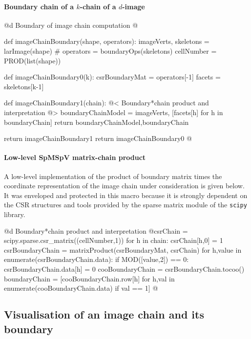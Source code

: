 \documentclass[11pt,oneside]{article}	%
\begin{document}
\paragraph{Boundary chain of a $k$-chain of a $d$-image}

@d Boundary of image chain computation
@{def imageChainBoundary(shape, operators):
	imageVerts, skeletons = larImage(shape)
	# operators = boundaryOps(skeletons)
	cellNumber = PROD(list(shape))
	
	def imageChainBoundary0(k):
		csrBoundaryMat = operators[-1]
		facets = skeletons[k-1]
		
		def imageChainBoundary1(chain):
			@< Boundary*chain product and interpretation @>
			boundaryChainModel = imageVerts, [facets[h] for h in boundaryChain]		
			return boundaryChainModel,boundaryChain
		
		return imageChainBoundary1
	return imageChainBoundary0
@}

\paragraph{Low-level SpMSpV matrix-chain product}

A low-level implementation of the product of boundary matrix times the coordinate representation of the image chain under consideration is given below. It was enveloped and protected in this macro because it is strongly dependent on the CSR structures and tools provided by the sparse matrix module of the \texttt{scipy} library.	

@d Boundary*chain product and interpretation
@{csrChain = scipy.sparse.csr_matrix((cellNumber,1))
for h in chain: csrChain[h,0] = 1
csrBoundaryChain = matrixProduct(csrBoundaryMat, csrChain)
for h,value in enumerate(csrBoundaryChain.data):
	if MOD([value,2]) == 0: csrBoundaryChain.data[h] = 0
cooBoundaryChain = csrBoundaryChain.tocoo()
boundaryChain = [cooBoundaryChain.row[h] 
	for h,val in enumerate(cooBoundaryChain.data) if val == 1]
@}


\subsection{Visualisation of an image chain and its boundary}
\end{document}
